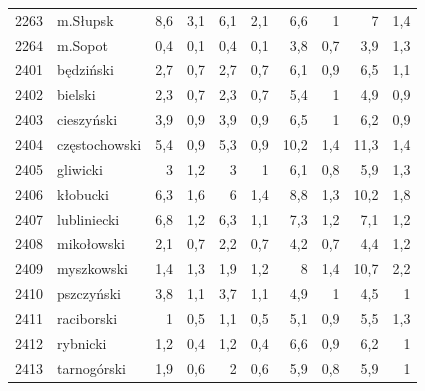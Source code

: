 \begin{center}
\begin{longtable}{lp{3cm}rrrrrrrr}
2263 & m.Słupsk                & 8,6     & 3,1         & 6,1      & 2,1          & 6,6      & 1            & 7        & 1,4          \\
2264 & m.Sopot                 & 0,4     & 0,1         & 0,4      & 0,1          & 3,8      & 0,7          & 3,9      & 1,3          \\
2401 & będziński               & 2,7     & 0,7         & 2,7      & 0,7          & 6,1      & 0,9          & 6,5      & 1,1          \\
2402 & bielski                 & 2,3     & 0,7         & 2,3      & 0,7          & 5,4      & 1            & 4,9      & 0,9          \\
2403 & cieszyński              & 3,9     & 0,9         & 3,9      & 0,9          & 6,5      & 1            & 6,2      & 0,9          \\
2404 & częstochowski           & 5,4     & 0,9         & 5,3      & 0,9          & 10,2     & 1,4          & 11,3     & 1,4          \\
2405 & gliwicki                & 3       & 1,2         & 3        & 1            & 6,1      & 0,8          & 5,9      & 1,3          \\
2406 & kłobucki                & 6,3     & 1,6         & 6        & 1,4          & 8,8      & 1,3          & 10,2     & 1,8          \\
2407 & lubliniecki             & 6,8     & 1,2         & 6,3      & 1,1          & 7,3      & 1,2          & 7,1      & 1,2          \\
2408 & mikołowski              & 2,1     & 0,7         & 2,2      & 0,7          & 4,2      & 0,7          & 4,4      & 1,2          \\
2409 & myszkowski              & 1,4     & 1,3         & 1,9      & 1,2          & 8        & 1,4          & 10,7     & 2,2          \\
2410 & pszczyński              & 3,8     & 1,1         & 3,7      & 1,1          & 4,9      & 1            & 4,5      & 1            \\
2411 & raciborski              & 1       & 0,5         & 1,1      & 0,5          & 5,1      & 0,9          & 5,5      & 1,3          \\
2412 & rybnicki                & 1,2     & 0,4         & 1,2      & 0,4          & 6,6      & 0,9          & 6,2      & 1            \\
2413 & tarnogórski             & 1,9     & 0,6         & 2        & 0,6          & 5,9      & 0,8          & 5,9      & 1            \\

\end{longtable}
\end{center}
